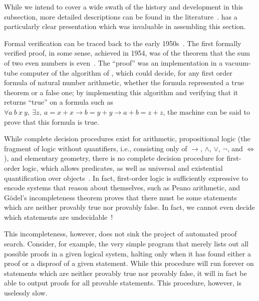 While we intend to cover a wide swath of the history and development in this subsection, more detailed descriptions can be found in the literature~\cites{ringer2020qed,Proof2009Geuvers,History2014Harrison,CoqArtForward2013Huet,Brief2019Darbari,davis2001early,Matuszewski05mizar:the,Automath2002Kamareddine,Milestones2019Moore,Automation2013Moore,LCF2000Gordon,LCF2019Paulson,Logical2002Pfenning}[Related Work]{nuprl}.
\textcite[ch.~4]{ringer2020qed} has a particularly clear presentation which was invaluable in assembling this section.

Formal verification can be traced back to the early 1950s~\cite{Brief2019Darbari}.
The first formally verified proof, in some sense, achieved in 1954, was of the theorem that the sum of two even numbers is even~\cite{davis2001early}.
The ``proof'' was an implementation in a vacuum-tube computer of the algorithm of \textcite{Uber1929Presburger}, which could decide, for any first order formula of natural number arithmetic, whether the formula represented a true theorem or a false one;
by implementing this algorithm and verifying that it returns ``true'' on a formula such as $\forall a\ b\ x\ y,\ \exists z,\ a = x + x \to b = y + y \to a + b = z + z$, the machine can be said to prove that this formula is true.

While complete decision procedures exist for arithmetic, propositional logic (the fragment of logic without quantifiers, i.e., consisting only of $\to$, $\wedge$, $\vee$, $\neg$, and $\iff$), and elementary geometry, there is no complete decision procedure for first-order logic, which allows predicates, as well as universal and existential quantification over objects~\cite{davis2001early}.
In fact, first-order logic is sufficiently expressive to encode systems that reason about themselves, such as Peano arithmetic, and Gödel's incompleteness theorem proves that there must be some statements which are neither provably true nor provably false.
In fact, we cannot even decide which statements are undecidable~\cite{Are2011Makholm}!

This incompleteness, however, does not sink the project of automated proof search.
Consider, for example, the very simple program that merely lists out all possible proofs in a given logical system, halting only when it has found either a proof or a disproof of a given statement.
While this procedure will run forever on statements which are neither provably true nor provably false, it will in fact be able to output proofs for all provable statements.
This procedure, however, is uselessly slow.

